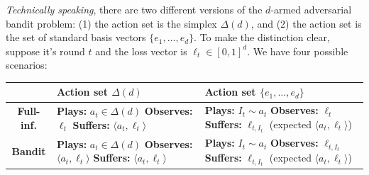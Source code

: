 \textit{Technically speaking}, there are two different versions of the
$d$-armed adversarial bandit problem: (1) the action set is the simplex
$\Delta(d)$, and (2) the action set is the set of standard basis vectors
$\{e_1, \ldots, e_d\}$.
To make the distinction clear,
suppose it's round $t$ and the loss vector is $\ell_t \in [0,1]^d$.
We have four possible scenarios:
\begin{center}
    \begin{tabular}{|c|p{5.5cm}|p{5.5cm}|}
        \hline
                           & \textbf{Action set $\Delta(d)$}                                                                                                                         & \textbf{Action set $\{e_1, \ldots, e_d\}$}                                                                                                                     \\
        \hline
        \textbf{Full-inf.} & \textbf{Plays:} $a_t \in \Delta(d)$ \newline \textbf{Observes:} $\ell_t$ \newline \textbf{Suffers:} $\langle a_t, \ell_t \rangle$
                           & \textbf{Plays:} $I_t \sim a_t$ \newline \textbf{Observes:} $\ell_t$ \newline \textbf{Suffers:} $\ell_{t, I_t}$ (expected $\langle a_t, \ell_t \rangle$)                                                                                                                                                                  \\
        \hline
        \textbf{Bandit}    & \textbf{Plays:} $a_t \in \Delta(d)$ \newline \textbf{Observes:} $\langle a_t, \ell_t \rangle$ \newline \textbf{Suffers:} $\langle a_t, \ell_t \rangle$  & \textbf{Plays:} $I_t \sim a_t$ \newline \textbf{Observes:} $\ell_{t, I_t}$ \newline \textbf{Suffers:} $\ell_{t, I_t}$ (expected $\langle a_t, \ell_t \rangle$) \\
        \hline
    \end{tabular}
\end{center}


